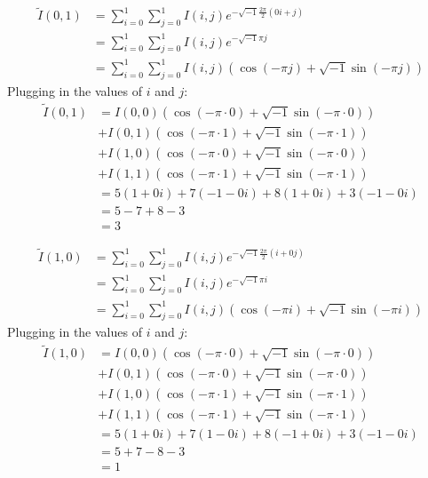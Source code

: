 \documentclass[a4paper]{article}
\begin{document}
	    \begin{align*}	     
	    \tilde{I}(0,1)&=\sum_{i=0}^1\sum_{j=0}^1I(i, j)e^{-\sqrt{-1}\frac{2\pi}{2}\left(0i + j\right)}
			\\&=\sum_{i=0}^1\sum_{j=0}^1I(i,j)e^{-\sqrt{-1}\pi j}
			\\&=\sum_{i=0}^1\sum_{j=0}^1I(i,j)\left(\cos{\left(-\pi j\right)}+\sqrt{-1}\sin{\left(-\pi j\right)}\right)
	    \end{align*}
	    Plugging in the values of $i$ and $j$:
	    \begin{align*}
	    \tilde{I}(0,1)&=I(0,0)\left(\cos{\left(-\pi\cdot0\right)}+\sqrt{-1}\sin{\left(-\pi\cdot0\right)}\right)
			\\&+I(0,1)\left(\cos{\left(-\pi\cdot1\right)}+\sqrt{-1}\sin{\left(-\pi\cdot1\right)}\right)
			\\&+I(1,0)\left(\cos{\left(-\pi\cdot0\right)}+\sqrt{-1}\sin{\left(-\pi\cdot0\right)}\right)
			\\&+I(1,1)\left(\cos{\left(-\pi\cdot1\right)}+\sqrt{-1}\sin{\left(-\pi\cdot1\right)}\right)
			\\&=5\left(1+0i\right)+7\left(-1-0i\right)+8\left(1+0i\right)+3\left(-1-0i\right)
			\\&=5-7+8-3
			\\&=3
	    \end{align*}
	    
	    	    \begin{align*}	     
	    \tilde{I}(1,0)&=\sum_{i=0}^1\sum_{j=0}^1I(i, j)e^{-\sqrt{-1}\frac{2\pi}{2}\left(i + 0j\right)}
			\\&=\sum_{i=0}^1\sum_{j=0}^1I(i,j)e^{-\sqrt{-1}\pi i}
			\\&=\sum_{i=0}^1\sum_{j=0}^1I(i,j)\left(\cos{\left(-\pi i\right)}+\sqrt{-1}\sin{\left(-\pi i\right)}\right)
	    \end{align*}
	    Plugging in the values of $i$ and $j$:
	    \begin{align*}
	    \tilde{I}(1,0)&=I(0,0)\left(\cos{\left(-\pi\cdot0\right)}+\sqrt{-1}\sin{\left(-\pi\cdot0\right)}\right)
			\\&+I(0,1)\left(\cos{\left(-\pi\cdot0\right)}+\sqrt{-1}\sin{\left(-\pi\cdot0\right)}\right)
			\\&+I(1,0)\left(\cos{\left(-\pi\cdot1\right)}+\sqrt{-1}\sin{\left(-\pi\cdot1\right)}\right)
			\\&+I(1,1)\left(\cos{\left(-\pi\cdot1\right)}+\sqrt{-1}\sin{\left(-\pi\cdot1\right)}\right)
			\\&=5\left(1+0i\right)+7\left(1-0i\right)+8\left(-1+0i\right)+3\left(-1-0i\right)
			\\&=5+7-8-3
			\\&=1
	    \end{align*}
	   
\end{document}
